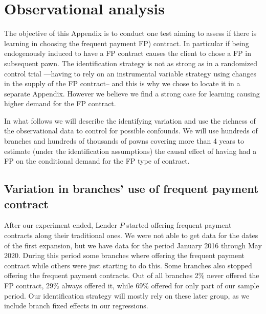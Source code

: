 


\newpage
\section{ Observational analysis}
\label{appendix_b}
\vspace{.2in}
\normalsize
\linespread{1.25}
\normalsize
\linespread{1.25}


The objective of this Appendix is to conduct one test aiming to assess if there is learning in choosing the frequent payment FP) contract. In particular if being endogenously induced to have a FP contract causes the client to chose a FP in subsequent pawn. The identification strategy is not as strong as in a randomized control trial ---having to rely on an instrumental variable strategy using changes in the supply of the FP contract-- and this is why we chose to locate it in a separate Appendix. However we believe we find a strong case for learning causing higher demand for the FP contract.

In what follows we will describe the identifying variation and use the richness of the observational data to control for possible confounds. We will use hundreds of branches and hundreds of thousands of pawns covering more than 4 years to estimate (under the identification assumptions) the causal effect of having had a FP on the conditional demand for the FP type of contract.


\vspace{.in}


\subsection{Variation in branches' use of frequent payment contract}

After our experiment ended, Lender $P$ started offering frequent payment contracts along their traditional ones. We were not able to get data for the dates of the first expansion, but we have data for the period January 2016 through May 2020. During this period some branches where offering the frequent payment contract while others were just starting to do this. Some branches also stopped offering the frequent payment contracts. Out of all branches 2\% never offered the FP contract, 29\% always offered it, while 69\% offered for only part of our sample period. Our identification strategy will mostly rely on these later group, as we include branch fixed effects in our regressions. \\


